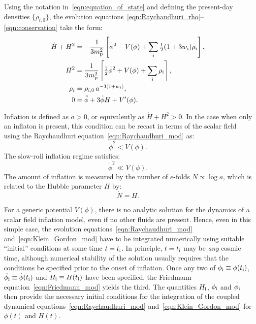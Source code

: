 Using the notation in~\eqref{eqn:equation_of_state} and defining the present-day densities $\{\rho_{i,0}\}$, the evolution equations~\eqref{eqn:Raychaudhuri_rho}--\eqref{eqn:conservation} take the form:
%
\begin{align}
  \dot{H}+H^2 &= 
  -\frac{1}{3m_{\mathrm{p}}^2}\left[\dot{\phi}^2 - V(\phi) +
  \sum_i{\textstyle\frac{1}{2}}(1+3w_i)\rho_i\right] ,
  \label{eqn:Raychaudhuri_mod}
  \\
  H^2 &= 
  \frac{1}{3m_{\mathrm{p}}^2}\left[{\textstyle\frac{1}{2}}\dot{\phi}^2 + V(\phi) +
  \sum_i\rho_i\right],
  \label{eqn:Friedmann_mod} 
  \\
  \rho_i &= 
  \rho_{i,0} \,a^{-3(1+w_i)},
  \label{eqn:rho_a} 
  \\ 
  0&= 
  \ddot{\phi} +3\dot{\phi}H + V^\prime(\phi).
  \label{eqn:Klein_Gordon_mod}
\end{align}
%                                                          

Inflation is defined as $\ddot{a}>0$, or equivalently as $\dot{H}+H^2>0$. In the case when only an inflaton is present, this condition can be recast in terms of the scalar field using the Raychaudhuri equation~\eqref{eqn:Raychaudhuri_mod} as:
%
\begin{equation}
  \dot{\phi}^2<V(\phi).
  \label{eqn:Onset_inflation}
\end{equation}
%
The slow-roll inflation regime satisfies:
%
\begin{equation}
  \dot{\phi}^2\ll V(\phi).
  \label{eqn:Slow-roll}
\end{equation}
%
The amount of inflation is measured by the number of $e$-folds $N\propto \log a$, which is related to the Hubble parameter $H$ by:
%
\begin{equation}
  \dot{N}=H.\label{eqn:e-folds}
\end{equation}
%

For a generic potential $V(\phi)$, there is no analytic solution for the dynamics of a scalar field inflation model, even if no other fluids are present. Hence, even in this simple case, the evolution equations~\eqref{eqn:Raychaudhuri_mod} and~\eqref{eqn:Klein_Gordon_mod} have to be integrated numerically using suitable ``initial'' conditions at some time $t=t_{\mathrm{i}}$. In principle, $t=t_{\mathrm{i}}$ may be {\em any\/} cosmic time, although numerical stability of the solution usually requires that the conditions be specified prior to the onset of inflation.  Once any two of $\phi_{\mathrm{i}} \equiv \phi(t_{\mathrm{i}})$, $\dot{\phi_{\mathrm{i}}} \equiv \dot{\phi}(t_{\mathrm{i}})$ and $H_{\mathrm{i}} \equiv H(t_{\mathrm{i}})$ have been specified, the Friedmann equation~\eqref{eqn:Friedmann_mod} yields the third. The quantities $H_{\mathrm{i}}$, $\phi_{\mathrm{i}}$ and $\dot{\phi_{\mathrm{i}}}$ then provide the necessary initial conditions for the integration of the coupled dynamical equations~\eqref{eqn:Raychaudhuri_mod} and~\eqref{eqn:Klein_Gordon_mod} for $\phi(t)$ and $H(t)$.
